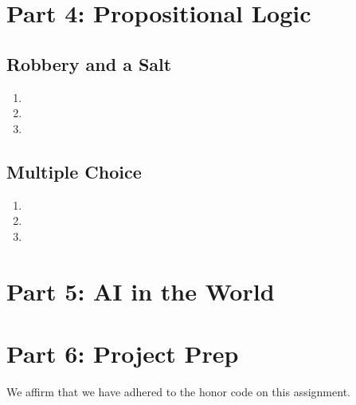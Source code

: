 \documentclass[11pt]{amsart}
\newcommand{\honor}{We affirm that we have adhered to the honor code on this assignment.}
\begin{document}
\section*{Part 4: Propositional Logic}

\subsection*{Robbery and a Salt}

\begin{enumerate}
\item
\item
\item
\end{enumerate}

\subsection*{Multiple Choice}

\begin{enumerate}
\item
\item
\item
\end{enumerate}

\section*{Part 5: AI in the World}

\section*{Part 6: Project Prep}

\honor
\end{document}
